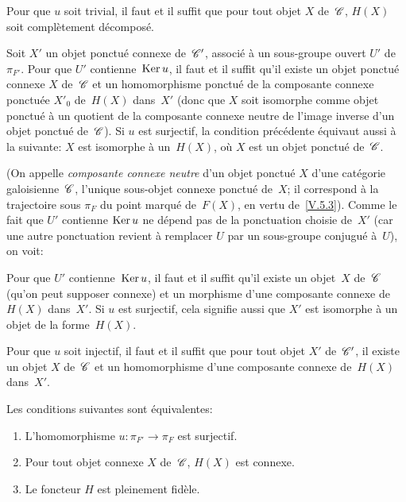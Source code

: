 \begin{corollaire}
\label{V.6.5}
Pour
que $u$ soit trivial, il faut et il suffit que pour tout objet
$X$ de~$\cal{C}$, $H(X)$ soit compl\`etement d\'ecompos\'e.
\end{corollaire}

\begin{proposition}
\label{V.6.6}
Soit $X'$ un objet ponctu\'e connexe de~${\cal{C}}'$, associ\'e
\`a un sous-groupe ouvert $U'$ de~$\pi_{F'}$. Pour que $U'$
contienne~$\operatorname{Ker} u$, il faut et il suffit qu'il existe un objet
ponctu\'e connexe $X$ de~$\cal{C}$ et un homomorphisme ponctu\'e
de la composante connexe ponctu\'ee $X'_0$ de~$H(X)$ dans~$X'$ (donc
que $X$ soit isomorphe comme objet ponctu\'e \`a un quotient de la
composante connexe neutre de l'image inverse d'un objet ponctu\'e
de~$\cal{C}$). Si $u$ est surjectif, la condition pr\'ec\'edente
\'equivaut aussi \`a la suivante: $X$ est isomorphe \`a
un~$H(X)$, o\`u $X$ est un objet ponctu\'e de~$\cal{C}$.
\end{proposition}

(On appelle \emph{composante connexe neutre}
d'un objet ponctu\'e $X$ d'une cat\'egorie galoisienne~$\cal{C}$,
l'unique sous-objet connexe ponctu\'e de~$X$; il correspond \`a la
trajectoire sous $\pi_F$ du point marqu\'e de~$F(X)$, en vertu
de~\ref{V.5.3}). Comme le fait que $U'$ contienne $\operatorname{Ker} u$ ne
d\'epend pas de la ponctuation choisie de~$X'$ (car une autre
ponctuation revient \`a remplacer $U$ par un sous-groupe
conjugu\'e \`a~$U$), on voit:

\begin{corollaire}
\label{V.6.7}
Pour que $U'$ contienne~$\operatorname{Ker} u$, il faut et il suffit qu'il existe un
\hbox{objet~$X$} de~$\cal{C}$ (qu'on peut supposer connexe) et un morphisme
d'une composante connexe de~$H(X)$ dans~$X'$. Si $u$ est surjectif,
cela signifie aussi que $X'$ est isomorphe \`a un objet de la
forme~$H(X)$.
\end{corollaire}

\begin{corollaire}
\label{V.6.8}
Pour que $u$ soit injectif, il faut et il suffit que pour tout objet
$X'$ de~${\cal{C}}'$, il existe un objet $X$ de~$\cal{C}$ et un
homomorphisme d'une composante connexe de~$H(X)$ dans~$X'$.
\end{corollaire}

\begin{proposition}
\label{V.6.9}
Les conditions suivantes sont \'equivalentes:
\begin{enumerate}
\item[(i)] L'homomorphisme $u\colon \pi_{F'} \to \pi_F$ est surjectif.
\item[(ii)] Pour tout objet connexe $X$ de~$\cal{C}$, $H(X)$ est
connexe.
\item[(iii)] Le foncteur $H$ est pleinement fid\`ele.
\end{enumerate}
\end{proposition}

